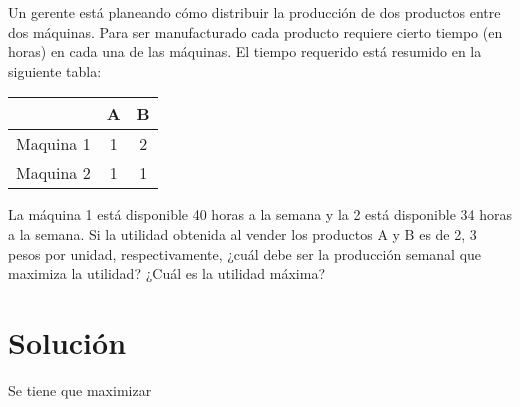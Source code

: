 \documentclass{article}
\begin{document}
Un gerente está planeando cómo distribuir la producción de dos productos entre dos máquinas. Para ser manufacturado cada producto requiere cierto tiempo (en horas) en cada una de las máquinas.
El tiempo requerido está resumido en la siguiente tabla:

\bigskip

\begin{tabular}{|c|c|c|}
  \hline
  &A&B\\
  \hline
  Maquina 1&1&2\\
  Maquina 2&1&1\\
  \hline
  
\end{tabular}

\bigskip

La máquina 1 está disponible 40 horas a la semana y la 2 está
disponible 34 horas a la semana. Si la utilidad obtenida al vender los
productos A y B es de 2, 3 pesos por unidad, respectivamente, ¿cuál
debe ser la producción semanal que maximiza la utilidad? ¿Cuál es la utilidad máxima?

\section{Solución}

Se tiene que maximizar 
\end{document}
